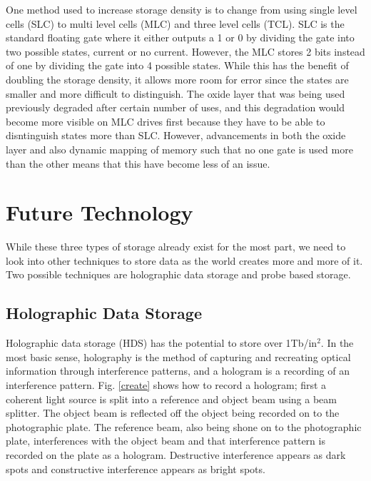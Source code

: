 \documentclass[ notitlepage, numerical, 11pt]{revtex4-1} %
\begin{document}
One method used to increase storage density is to change from using single level cells (SLC) to multi level cells (MLC) and three level cells (TCL). SLC is the standard floating gate where it either outputs a 1 or 0 by dividing the gate into two possible states, current or no current. However, the MLC stores 2 bits instead of one by dividing the gate into 4 possible states. While this has the benefit of doubling the storage density, it allows more room for error since the states are smaller and more difficult to distinguish. The oxide layer that was being used previously degraded after certain number of uses, and this degradation would become more visible on MLC drives first because they have to be able to disntinguish states more than SLC. However, advancements in both the oxide layer and also dynamic mapping of memory such that no one gate is used more than the other means that this have become less of an issue.

\section{Future Technology}

While these three types of storage already exist for the most part, we need to look into other techniques to store data as the world creates more and more of it. Two possible techniques are holographic data storage and probe based storage.
\subsection{Holographic Data Storage}
Holographic data storage (HDS) has the potential to store over 1Tb/in$^2$. In the most basic sense, holography is the method of capturing and recreating optical information through interference patterns, and a hologram is a recording of an interference pattern. Fig. \ref{create} shows how to record a hologram; first a coherent light source is split into a reference and object beam using a beam splitter. The object beam is reflected off the object being recorded on to the photographic plate. The reference beam, also being shone on to the photographic plate,  interferences with the object beam and that interference pattern is recorded on the plate as a hologram. Destructive interference appears as dark spots and constructive interference appears as bright spots. 
\end{document}
